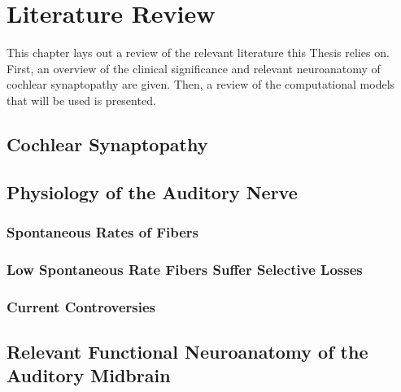 \chapter{Literature Review}
\label{chapter:literaturereview}
\thispagestyle{myheadings}
\graphicspath{{2_LiteratureReview/Figures/}}
This chapter lays out a review of the relevant literature this Thesis relies on. First, an overview of the clinical significance and relevant neuroanatomy of cochlear synaptopathy are given.  Then, a review of the computational models that will be used is presented. 
\section{Cochlear Synaptopathy} %
\label{sec:cochlear_synaptopathy}


\section{Physiology of the Auditory Nerve} %
\label{sec:physiology_of_the_auditory_nerve}
\subsection{Spontaneous Rates of Fibers} %
\label{sub:spontaneous_rates_of_fibers}

\subsection{Low Spontaneous Rate Fibers Suffer Selective Losses} %
\label{sub:low_spontaneous_rate_fibers_suffer_selective_losses}


\subsection{Current Controversies} %
\label{sub:current_controversies}

\section{Relevant Functional Neuroanatomy of the Auditory Midbrain} %
\label{sec:relevant_functional_neuroanatomy_of_the_auditory_midbrain}

